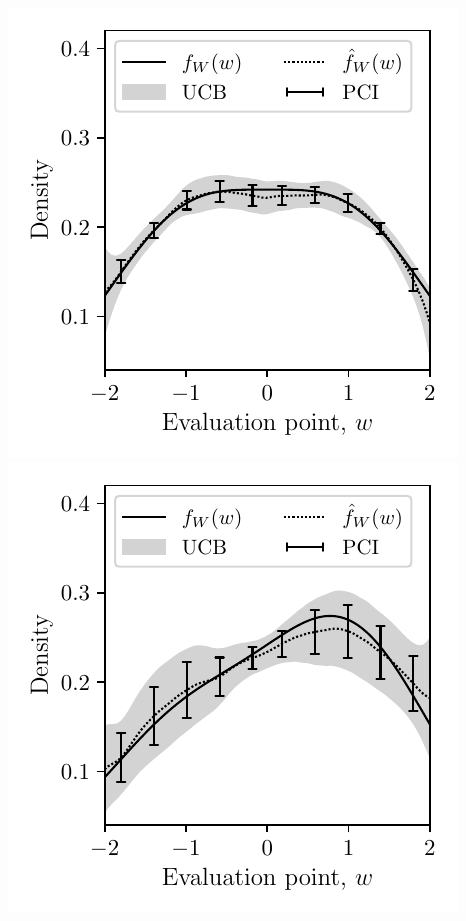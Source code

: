 \documentclass{article}
\begin{document}
\includegraphics[scale=0.5]{graphics/outcome_plot_total.pdf}
\includegraphics[scale=0.5]{graphics/outcome_plot_partial.pdf}
\end{document}
